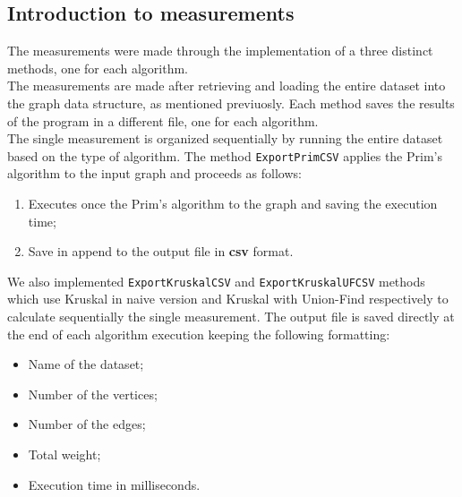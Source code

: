 \subsection{Introduction to measurements}
The measurements were made through the implementation of a three distinct methods, one for each algorithm. \\ \noindent
The measurements are made after retrieving and loading the entire dataset into the graph data structure, as mentioned previuosly. Each method saves the results of the program in a different file, one for each algorithm.\\
\noindent
The single measurement is organized sequentially by running the entire dataset based on the type of algorithm. The method \verb|ExportPrimCSV| applies the Prim's algorithm to the input graph and proceeds as follows:
\begin{enumerate}
    \item Executes once the Prim's algorithm to the graph and saving the execution time;
    \item Save in append to the output file in \textbf{csv} format. 
\end{enumerate}
We also implemented \verb|ExportKruskalCSV| and \verb|ExportKruskalUFCSV| methods which use Kruskal in naive version and Kruskal with Union-Find respectively to calculate sequentially the single measurement.
\noindent
The output file is saved directly at the end of each algorithm execution keeping the following formatting:
\begin{itemize}
    \item Name of the dataset;
    \item Number of the vertices;
    \item Number of the edges;
    \item Total weight;
    \item Execution time in milliseconds.
\end{itemize}